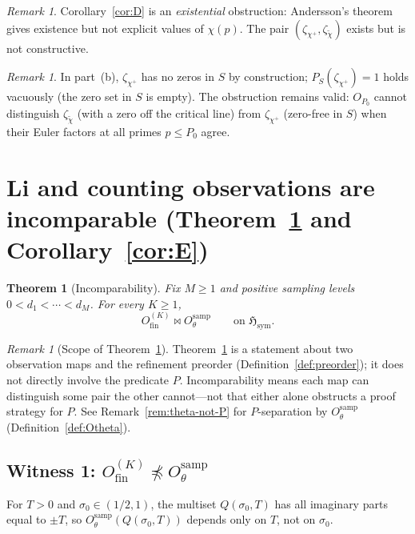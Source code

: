 \documentclass[12pt]{amsart}
\theoremstyle{definition}
\theoremstyle{remark}
\newtheorem{remark}[definition]{Remark}
\theoremstyle{plain}
\newtheorem{mainthm}{Theorem}
\newcommand{\Hsym}{\mathfrak{H}_{\mathrm{sym}}}
\newcommand{\Ofinite}{O_{\mathrm{fin}}}
\newcommand{\Otheta}{O_{\theta}^{\mathrm{samp}}}
\newcommand{\incomp}{\mathbin{\bowtie}}
\begin{document}
\begin{remark}
Corollary~\ref{cor:D} is an \emph{existential} obstruction: Andersson's theorem
gives existence but not explicit values of $\chi(p)$.  The pair
$(\zeta_{\chi^+}, \zeta_{\tilde\chi})$ exists but is not constructive.
\end{remark}

\begin{remark}
In part~(b), $\zeta_{\chi^+}$ has no zeros in $S$ by construction;
$P_S(\zeta_{\chi^+}) = 1$ holds vacuously (the zero set in $S$ is empty).
The obstruction remains valid: $O_{P_0}$ cannot distinguish
$\zeta_{\tilde\chi}$ (with a zero off the critical line) from
$\zeta_{\chi^+}$ (zero-free in $S$) when their Euler factors at all
primes $p \leq P_0$ agree.
\end{remark}

\section{Li and counting observations are incomparable (Theorem~\ref{thm:C}
and Corollary~\ref{cor:E})}
\label{sec:H}

\begin{mainthm}[Incomparability]
\label{thm:C}
Fix $M \geq 1$ and positive sampling levels $0 < d_1 < \cdots < d_M$.
For every $K \geq 1$,
\[
  \Ofinite^{(K)} \incomp \Otheta \qquad \text{on } \Hsym.
\]
\end{mainthm}

\begin{remark}[Scope of Theorem~\ref{thm:C}]
Theorem~\ref{thm:C} is a statement about two observation maps and the
refinement preorder (Definition~\ref{def:preorder}); it does not directly involve the predicate $P$.
Incomparability means each map can distinguish some pair the other
cannot---not that either alone obstructs a proof strategy for $P$.
See Remark~\ref{rem:theta-not-P} for $P$-separation by $\Otheta$
(Definition~\ref{def:Otheta}).
\end{remark}

\subsection{Witness 1: \texorpdfstring{$\Ofinite^{(K)} \npreceq \Otheta$}{O-theta does not refine O-fin}}

For $T > 0$ and $\sigma_0 \in (1/2, 1)$, the multiset $Q(\sigma_0, T)$
has all imaginary parts equal to $\pm T$, so $\Otheta(Q(\sigma_0, T))$
depends only on $T$, not on $\sigma_0$.
\end{document}
